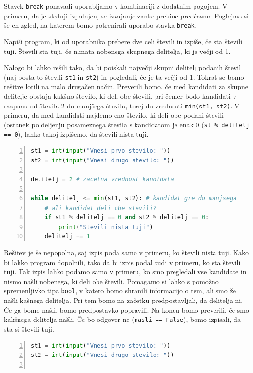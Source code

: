 Stavek \texttt{break} ponavadi uporabljamo v kombinaciji z dodatnim pogojem. V primeru, da je slednji izpolnjen, se izvajanje zanke prekine predčasno. Poglejmo si še en zgled, na katerem bomo potrenirali uporabo stavka \texttt{break}. 

\begin{zgled}
Napiši program, ki od uporabnika prebere dve celi števili in izpiše, če sta števili tuji. Števili sta tuji, če nimata nobenega skupnega delitelja, ki je večji od 1.
\end{zgled}
\begin{resitev}
Nalogo bi lahko rešili tako, da bi poiskali največji skupni delitelj podanih števil (naj bosta to števili \texttt{st1} in \texttt{st2}) in pogledali, če je ta večji od 1. Tokrat se bomo rešitve lotili na malo drugačen način. Preverili bomo, če med kandidati za skupne delitelje obstaja kakšno število, ki deli obe števili, pri čemer bodo kandidati v razponu od števila 2 do manjšega števila, torej do vrednosti \texttt{min(st1, st2)}. V primeru, da med kandidati najdemo eno število, ki deli obe podani števili (ostanek po deljenju posameznega števila s kandidatom je enak 0 (\texttt{st \% delitelj == 0}), lahko takoj izpišemo, da števili nista tuji.
\begin{lstlisting}[language=Python, showstringspaces=false,numbers=left]
st1 = int(input("Vnesi prvo stevilo: "))
st2 = int(input("Vnesi drugo stevilo: "))

delitelj = 2 # zacetna vrednost kandidata

while delitelj <= min(st1, st2): # kandidat gre do manjsega
    # ali kandidat deli obe stevili?
    if st1 % delitelj == 0 and st2 % delitelj == 0:
        print("Stevili nista tuji")
    delitelj += 1
\end{lstlisting}
Rešitev je še nepopolna, saj izpis poda samo v primeru, ko števili nista tuji. Kako bi lahko program dopolnili, tako da bi izpis podal tudi v primeru, ko sta števili tuji. Tak izpis lahko podamo samo v primeru, ko smo pregledali vse kandidate in nismo našli nobenega, ki deli obe števili. Pomagamo si lahko s pomožno spremenljivko tipa \texttt{bool}, v katero bomo shranili informacijo o tem, ali smo že našli kašnega delitelja. Pri tem bomo na začetku predpostavljali, da delitelja ni. Če ga bomo našli, bomo predpostavko popravili. Na koncu bomo preverili, če smo kakšnega delitelja našli. Če bo odgovor ne (\texttt{nasli == False}), bomo izpisali, da sta si števili tuji.
\begin{lstlisting}[language=Python, showstringspaces=false,numbers=left]
st1 = int(input("Vnesi prvo stevilo: "))
st2 = int(input("Vnesi drugo stevilo: "))


\end{lstlisting}
\end{resitev}
